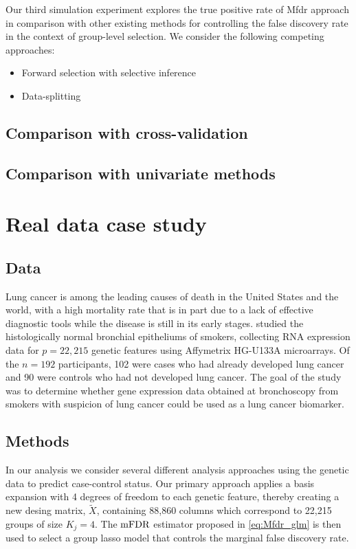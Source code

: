 Our third simulation experiment explores the true positive rate of Mfdr approach in comparison with other existing methods for controlling the false discovery rate in the context of group-level selection.  We consider the following competing approaches:

\begin{itemize}[leftmargin=*, labelindent=0.5cm]
\item Forward selection with selective inference
\item Data-splitting
\end{itemize}

\subsection{Comparison with cross-validation}


\subsection{Comparison with univariate methods}

\section{Real data case study}

\subsection{Data}

Lung cancer is among the leading causes of death in the United States and the world, with a high mortality rate that is in part due to a lack of effective diagnostic tools while the disease is still in its early stages. \citet{Spira2007} studied the histologically normal bronchial epitheliums of smokers, collecting RNA expression data for $p = 22,215$ genetic features using Affymetrix HG-U133A microarrays.  Of the $n = 192$ participants, 102 were cases who had already developed lung cancer and 90 were controls who had not developed lung cancer.  The goal of the study was to determine whether gene expression data obtained at bronchoscopy from smokers with suspicion of lung cancer could be used as a lung cancer biomarker.

\subsection{Methods}

In our analysis we consider several different analysis approaches using the genetic data to predict case-control status. Our primary approach applies a basis expansion with 4 degrees of freedom to each genetic feature, thereby creating a new desing matrix, $\tilde{X}$, containing 88,860 columns which correspond to 22,215 groups of size $K_j = 4$.  The $\textrm{mFDR}$ estimator proposed in \ref{eq:Mfdr_glm} is then used to select a group lasso model that controls the marginal false discovery rate.  

